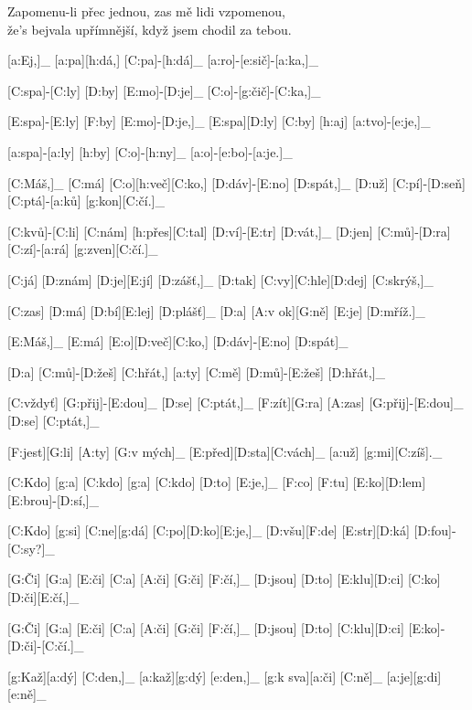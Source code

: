Zapomenu-li přec jednou, zas mě lidi vzpomenou,\\
že's bejvala upřímnější, když jsem chodil za tebou.



[a:Ej,]_ [a:pa][h:dá,] [C:pa]-[h:dá]_ [a:ro]-[e:sič]-[a:ka,]_

[C:spa]-[C:ly] [D:by] [E:mo]-[D:je]_ [C:o]-[g:čič]-[C:ka,]_

[E:spa]-[E:ly] [F:by] [E:mo]-[D:je,]_
[E:spa][D:ly] [C:by] [h:aj] [a:tvo]-[e:je,]_

[a:spa]-[a:ly] [h:by] [C:o]-[h:ny]_ [a:o]-[e:bo]-[a:je.]_



[C:Máš,]_ [C:má] [C:o][h:več][C:ko,] [D:dáv]-[E:no] [D:spát,]_
[D:už] [C:pí]-[D:seň] [C:ptá]-[a:ků] [g:kon][C:čí.]_

[C:kvů]-[C:li] [C:nám] [h:přes][C:tal] [D:ví]-[E:tr] [D:vát,]_
[D:jen] [C:mů]-[D:ra] [C:zí]-[a:rá] [g:zven][C:čí.]_

[C:já] [D:znám] [D:je][E:jí] [D:zášť,]_
[D:tak] [C:vy][C:hle][D:dej] [C:skrýš,]_

[C:zas] [D:má] [D:bí][E:lej] [D:plášť]_
[D:a] [A:v ok][G:ně] [E:je] [D:mříž.]_

[E:Máš,]_ [E:má] [E:o][D:več][C:ko,] [D:dáv]-[E:no] [D:spát]_

[D:a] [C:mů]-[D:žeš] [C:hřát,] %
[a:ty] [C:mě] [D:mů]-[E:žeš] [D:hřát,]_

[C:vždyť] [G:přij]-[E:dou]_ [D:se] [C:ptát,]_
[F:zít][G:ra] [A:zas] [G:přij]-[E:dou]_ [D:se] [C:ptát,]_

[F:jest][G:li] [A:ty] [G:v mých]_ [E:před][D:sta][C:vách]_
[a:už] [g:mi][C:zíš]._



[C:Kdo] [g:a] [C:kdo] [g:a] [C:kdo] [D:to] [E:je,]_
[F:co] [F:tu] [E:ko][D:lem] [E:brou]-[D:sí,]_

[C:Kdo] [g:si] [C:ne][g:dá] [C:po][D:ko][E:je,]_
[D:všu][F:de] [E:str][D:ká] [D:fou]-[C:sy?]_

[G:Či] [G:a] [E:či] [C:a] [A:či] [G:či] [F:čí,]_
[D:jsou] [D:to] [E:klu][D:ci] [C:ko][D:či][E:čí,]_

[G:Či] [G:a] [E:či] [C:a] [A:či] [G:či] [F:čí,]_
[D:jsou] [D:to] [C:klu][D:ci] [E:ko]-[D:či]-[C:čí.]_



[g:Kaž][a:dý] [C:den,]_ [a:kaž][g:dý] [e:den,]_
[g:k sva][a:či] [C:ně]_ [a:je][g:di] [e:ně]_

